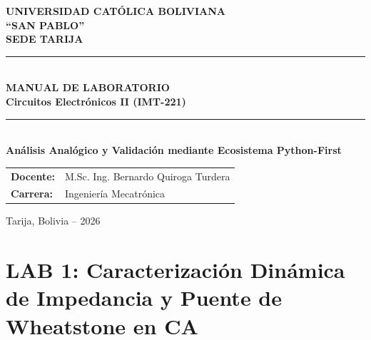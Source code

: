 \documentclass[10pt,a4paper,twoside]{article}
\begin{document}
\begin{titlepage}
    \centering
    \vspace*{3cm}
    {\huge\textbf{UNIVERSIDAD CATÓLICA BOLIVIANA}}\\[0.5cm]
    {\LARGE\textbf{``SAN PABLO''}}\\[0.5cm]
    {\Large\textbf{SEDE TARIJA}}\\[2cm]
    
    \rule{\textwidth}{1.5pt}\\[0.5cm]
    {\Huge \textbf{MANUAL DE LABORATORIO}}\\[0.3cm]
    {\LARGE \textbf{Circuitos Electrónicos II (IMT-221)}}\\[0.5cm]
    \rule{\textwidth}{1.5pt}\\[2cm]
    
    {\Large \textbf{Análisis Analógico y Validación mediante Ecosistema Python-First}}\\[2cm]
    
    \begin{tabular}{ll}
        \textbf{Docente:} & M.Sc. Ing. Bernardo Quiroga Turdera \\
        \textbf{Carrera:} & Ingeniería Mecatrónica \\
    \end{tabular}
    
    \vfill
    {\large Tarija, Bolivia -- 2026}
\end{titlepage}

\tableofcontents
\newpage

\section{LAB 1: Caracterización Dinámica de Impedancia y Puente de Wheatstone en CA}
\end{document}

